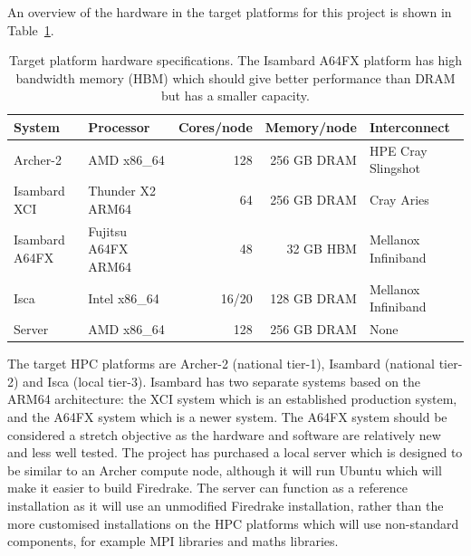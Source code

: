 \documentclass[a4paper,titlepage]{article}
\begin{document}
An overview of the hardware in the target platforms for this project is shown in Table~\ref{tab:hardware}. 
%
\begin{table}[htp]
\begin{center}
\begin{tabular}{|l|l|r|r|l|}
\hline 
System         & Processor        & Cores/node & Memory/node     & Interconnect \\
\hline
Archer-2       & AMD x86\_64         & 128        & 256 GB DRAM  & HPE Cray Slingshot  \\
Isambard XCI   & Thunder X2 ARM64    &  64        & 256 GB DRAM  & Cray Aries          \\
Isambard A64FX & Fujitsu A64FX ARM64 & 48         & 32 GB HBM    & Mellanox Infiniband \\
Isca           & Intel x86\_64       & 16/20      & 128 GB DRAM  & Mellanox Infiniband \\
Server         & AMD x86\_64         & 128        & 256 GB DRAM  & None                \\
\hline
\end{tabular}
\end{center}
\caption{Target platform hardware specifications. The Isambard A64FX platform has high bandwidth memory (HBM) which should give better performance than DRAM but has a smaller capacity.}
\label{tab:hardware}
\end{table}%
The target HPC platforms are Archer-2 (national tier-1), Isambard (national tier-2) and Isca (local tier-3). Isambard has two separate systems based on the ARM64 architecture: the XCI system which is an established production system, and the A64FX system which is a newer system. The A64FX system should be considered a stretch objective as the hardware and software are relatively new and less well tested. The project has purchased a local server which is designed to be similar to an Archer compute node, although it will run Ubuntu which will make it easier to build Firedrake. The server can function as a reference installation as it will use an unmodified Firedrake installation, rather than the more customised installations on the HPC platforms which will use non-standard components, for example MPI libraries and maths libraries.
\end{document}
